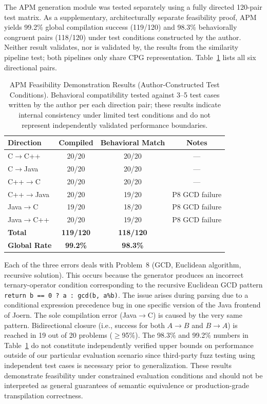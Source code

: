 The APM generation module was tested separately using a fully directed 120-pair test matrix. As a supplementary, architecturally separate feasibility proof, APM yields 99.2\% global compilation success (119/120) and 98.3\% behaviorally congruent pairs (118/120) under test conditions constructed by the author. Neither result validates, nor is validated by, the results from the similarity pipeline test; both pipelines only share CPG representation. Table~\ref{tab:apm_results} lists all six directional pairs.

\begin{table}[ht]
\caption{APM Feasibility Demonstration Results (Author-Constructed Test Conditions). Behavioral compatibility tested against 3--5 test cases written by the author per each direction pair; these results indicate internal consistency under limited test conditions and do not represent independently validated performance boundaries.}
\label{tab:apm_results}
\centering
\begin{tabular}{|l|c|c|c|}
\hline
\textbf{Direction} & \textbf{Compiled} & \textbf{Behavioral Match} & \textbf{Notes} \\
\hline
C$\rightarrow$C++     & 20/20 & 20/20 & --- \\
C$\rightarrow$Java    & 20/20 & 20/20 & --- \\
C++$\rightarrow$C     & 20/20 & 20/20 & --- \\
C++$\rightarrow$Java  & 20/20 & 19/20 & P8 GCD failure \\
Java$\rightarrow$C    & 19/20 & 18/20 & P8 GCD failure \\
Java$\rightarrow$C++  & 20/20 & 19/20 & P8 GCD failure \\
\hline
\textbf{Total}        & \textbf{119/120} & \textbf{118/120} & \\
\hline
\textbf{Global Rate} & \textbf{99.2\%} & \textbf{98.3\%} & \\
\hline
\end{tabular}
\end{table}

Each of the three errors deals with Problem~8 (GCD, Euclidean algorithm, recursive solution). This occurs because the generator produces an incorrect ternary-operator condition corresponding to the recursive Euclidean GCD pattern \texttt{return b == 0 ? a : gcd(b, a\%b)}. The issue arises during parsing due to a conditional expression precedence bug in one specific version of the Java frontend of Joern. The sole compilation error (Java$\rightarrow$C) is caused by the very same pattern. Bidirectional closure (i.e., success for both $A\rightarrow B$ and $B\rightarrow A$) is reached in 19 out of 20 problems ($\geq$95\%). The 98.3\% and 99.2\% numbers in Table~\ref{tab:apm_results} do not constitute independently verified upper bounds on performance outside of our particular evaluation scenario since third-party fuzz testing using independent test cases is necessary prior to generalization. These results demonstrate feasibility under constrained evaluation conditions and should not be interpreted as general guarantees of semantic equivalence or production-grade transpilation correctness.

